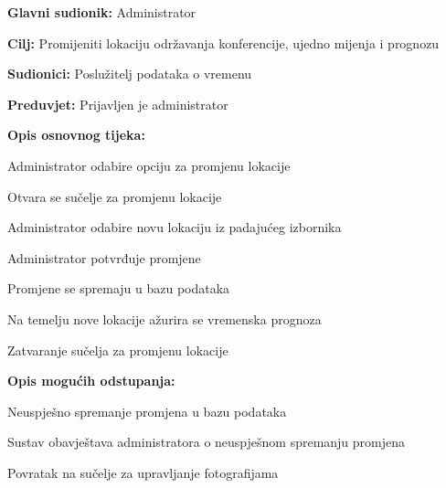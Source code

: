 					\noindent {}
					\begin{packed_item}
						
						\item \textbf{Glavni sudionik: }Administrator
						\item  \textbf{Cilj:} Promijeniti lokaciju održavanja konferencije, ujedno mijenja i prognozu
						\item  \textbf{Sudionici:} Poslužitelj podataka o vremenu
						\item  \textbf{Preduvjet:} Prijavljen je administrator
						\item  \textbf{Opis osnovnog tijeka:}
						
						\item[] \begin{packed_enum}
							
							\item Administrator odabire opciju za promjenu lokacije
							\item Otvara se sučelje za promjenu lokacije
							\item Administrator odabire novu lokaciju iz padajućeg izbornika
							\item Administrator potvrđuje promjene
							\item Promjene se spremaju u bazu podataka
							\item Na temelju nove lokacije ažurira se vremenska prognoza
							\item Zatvaranje sučelja za promjenu lokacije
						\end{packed_enum}
						
						\item  \textbf{Opis mogućih odstupanja:}
						
						\item[] \begin{packed_item}
							
							\item[5.a] Neuspješno spremanje promjena u bazu podataka
							\item[] \begin{packed_enum}
								
								\item Sustav obavještava administratora o neuspješnom spremanju promjena
								\item Povratak na sučelje za upravljanje fotografijama
								
							\end{packed_enum}
							

\end{packed_item}
\end{packed_item}
